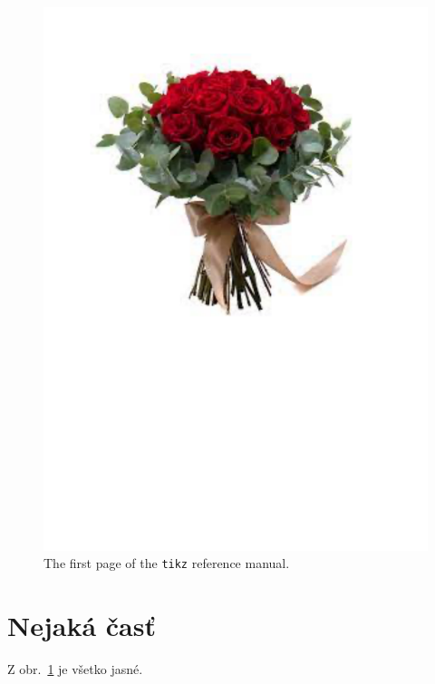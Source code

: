 \documentclass[10pt,twoside,slovak,a4paper]{article}
\begin{document}
\begin{figure}[htpb]
    \centering
    \includegraphics[scale=0.2]{Dokument1.pdf}
    \caption{The first page of the \texttt{tikz} reference manual.}
    \label{f:rozhod}
\end{figure}

\section{Nejaká časť} \label{nejaka}

Z obr.~\ref{f:rozhod} je všetko jasné. 



\end{document}
